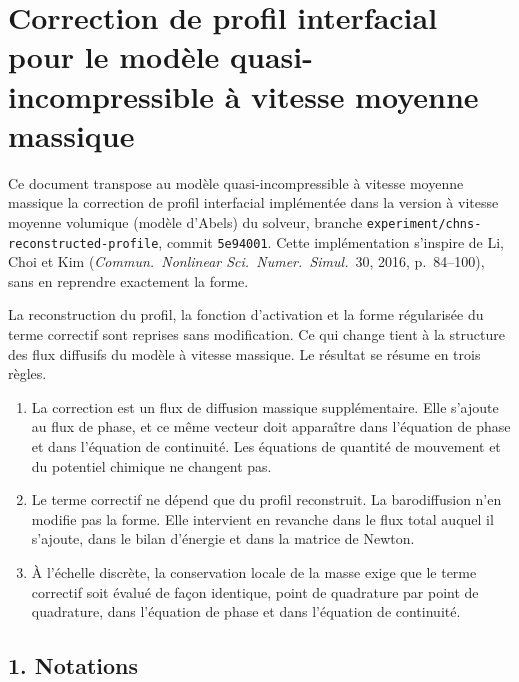 
\section*{Correction de profil interfacial pour le modèle quasi-incompressible à vitesse moyenne massique}

Ce document transpose au modèle quasi-incompressible à vitesse moyenne massique la correction de profil interfacial implémentée dans la version à vitesse moyenne volumique (modèle d'Abels) du solveur, branche \texttt{experiment/chns-reconstructed-profile}, commit \texttt{5e94001}. Cette implémentation s'inspire de Li, Choi et Kim (\emph{Commun.\ Nonlinear Sci.\ Numer.\ Simul.}~30, 2016, p.~84--100), sans en reprendre exactement la forme.

La reconstruction du profil, la fonction d'activation et la forme régularisée du terme correctif sont reprises sans modification. Ce qui change tient à la structure des flux diffusifs du modèle à vitesse massique. Le résultat se résume en trois règles.
\begin{enumerate}
  \item La correction est un flux de diffusion massique supplémentaire. Elle s'ajoute au flux de phase, et ce même vecteur doit apparaître dans l'équation de phase et dans l'équation de continuité. Les équations de quantité de mouvement et du potentiel chimique ne changent pas.
  \item Le terme correctif ne dépend que du profil reconstruit. La barodiffusion n'en modifie pas la forme. Elle intervient en revanche dans le flux total auquel il s'ajoute, dans le bilan d'énergie et dans la matrice de Newton.
  \item À l'échelle discrète, la conservation locale de la masse exige que le terme correctif soit évalué de façon identique, point de quadrature par point de quadrature, dans l'équation de phase et dans l'équation de continuité.
\end{enumerate}

\subsection*{1. Notations}

